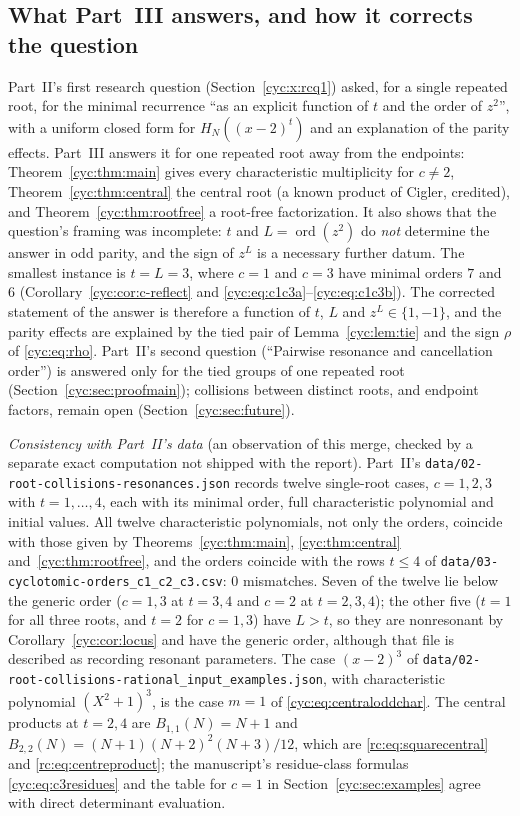 \documentclass[11pt,a4paper]{article}
\numberwithin{equation}{section}
\theoremstyle{definition}
\theoremstyle{remark}
\newcommand{\ord}{\operatorname{ord}}
\begin{document}
\subsection{What Part~III answers, and how it corrects the question}\label{cyc:sec:answers}
Part~II's first research question (Section~\ref{cyc:x:rcq1}) asked, for a single repeated root, for the minimal recurrence
``as an explicit function of $t$ and the order of $z^2$'', with a uniform
closed form for $H_N((x-2)^t)$ and an explanation of the parity effects.
Part~III answers it for one repeated root away from the endpoints:
Theorem~\ref{cyc:thm:main} gives every characteristic multiplicity for
$c\ne2$, Theorem~\ref{cyc:thm:central} the central root (a known product
of Cigler, credited), and Theorem~\ref{cyc:thm:rootfree} a root-free
factorization.  It also shows that the question's framing was incomplete:
$t$ and $L=\ord(z^2)$ do \emph{not} determine the answer in odd parity,
and the sign of $z^L$ is a necessary further datum.  The smallest
instance is $t=L=3$, where $c=1$ and $c=3$ have minimal orders $7$ and $6$
(Corollary~\ref{cyc:cor:c-reflect} and \eqref{cyc:eq:c1c3a}--\eqref{cyc:eq:c1c3b}).
The corrected statement of the answer is therefore a function of $t$, $L$
and $z^L\in\{1,-1\}$, and the parity effects are explained by the tied
pair of Lemma~\ref{cyc:lem:tie} and the sign $\rho$ of \eqref{cyc:eq:rho}.
Part~II's second question (``Pairwise resonance and cancellation order'')
is answered only for the tied groups of one repeated root
(Section~\ref{cyc:sec:proofmain}); collisions between distinct roots, and
endpoint factors, remain open (Section~\ref{cyc:sec:future}).

\emph{Consistency with Part~II's data} (an observation of this merge,
checked by a separate exact computation not shipped with the report).
Part~II's \nolinkurl{data/02-root-collisions-resonances.json} records
twelve single-root cases, $c=1,2,3$ with $t=1,\ldots,4$, each with its
minimal order, full characteristic polynomial and initial values.  All
twelve characteristic polynomials, not only the orders, coincide with
those given by Theorems~\ref{cyc:thm:main}, \ref{cyc:thm:central}
and~\ref{cyc:thm:rootfree}, and the orders coincide with the rows $t\le4$
of \nolinkurl{data/03-cyclotomic-orders_c1_c2_c3.csv}: $0$ mismatches.
Seven of the twelve lie below the generic order ($c=1,3$ at $t=3,4$ and
$c=2$ at $t=2,3,4$); the other five ($t=1$ for all three roots, and $t=2$
for $c=1,3$) have $L>t$, so they are nonresonant by
Corollary~\ref{cyc:cor:locus} and have the generic order, although that
file is described as recording resonant parameters.  The case $(x-2)^3$ of
\nolinkurl{data/02-root-collisions-rational_input_examples.json}, with
characteristic polynomial $(X^2+1)^3$, is the case $m=1$ of
\eqref{cyc:eq:centraloddchar}.  The central products at $t=2,4$ are
$B_{1,1}(N)=N+1$ and $B_{2,2}(N)=(N+1)(N+2)^2(N+3)/12$, which are
\eqref{rc:eq:squarecentral} and \eqref{rc:eq:centreproduct}; the
manuscript's residue-class formulas \eqref{cyc:eq:c3residues} and the
table for $c=1$ in Section~\ref{cyc:sec:examples} agree with direct
determinant evaluation.
\end{document}
